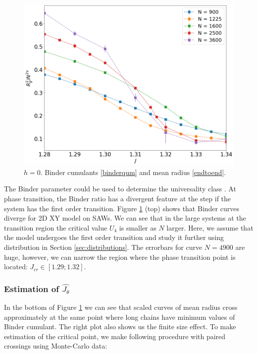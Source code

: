\begin{figure}[H]
 	\includegraphics[scale=0.23]{Images/rscaling_longchains.png} 	
 	
 	\caption{$h=0$. Binder  cumulants \eqref{binderqum} and mean radius \eqref{endtoend}.  }
 	\label{fig:bcshort}
 \end{figure}

The Binder parameter  could be used to determine the universality class \cite{binder1981finite}.  At phase transition, the Binder ratio  has a divergent feature at the step if the system has the first order transition. Figure \ref{fig:bcshort}  (top) shows that Binder curves diverge for 2D XY model on SAWs. We can see that in the large systems at the transition region the critical value $ U_4  $ is smaller as $N$ larger. Here, we assume that the model undergoes  the first order transition and study it further using distribution in Section \ref{sec:distributions}. The errorbars for curve $N=4900$ are huge, however, we can narrow the region where the phase transition point is located: $J_{cr} \in [1.29; 1.32]$. 

\subsubsection{ Estimation of $\hat{J_{\theta}}$}

In the bottom of Figure \ref{fig:bcshort} we can see that scaled curves of mean radius cross approximately at the same point where long chains have minimum values of Binder cumulant. The right plot also shows us the finite size effect. To make estimation of the critical point, we make following procedure with paired crossings using Monte-Carlo data: 

